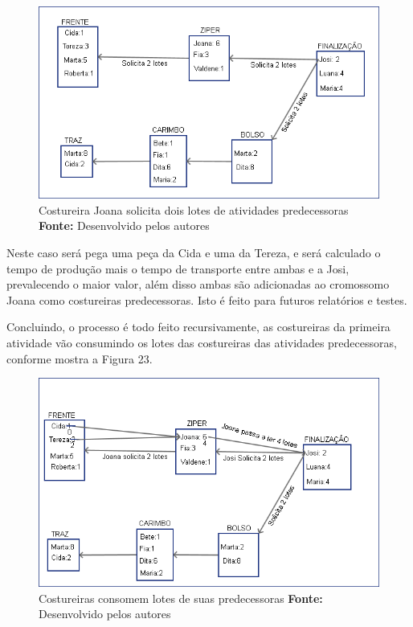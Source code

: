 \begin{figure}[h!]
	\centerline{\includegraphics[scale=0.7]{./imagens/processo_solciitacao_de_lotes2.png}}
	\caption[Distribuição de trabalho]
	{Costureira Joana solicita dois lotes de atividades predecessoras  \textbf{Fonte:} Desenvolvido pelos autores}
	\label{fig:exemplo1}
\end{figure}

\newpage

\par Neste caso será pega uma peça da Cida e uma da Tereza, e será calculado o tempo de produção mais o tempo de transporte entre ambas
e a Josi, prevalecendo o maior valor, além disso ambas são adicionadas ao cromossomo Joana como costureiras predecessoras. Isto é feito para futuros relatórios e testes.

\par Concluindo, o processo é todo feito recursivamente, as costureiras da primeira atividade vão consumindo os lotes das costureiras
das atividades predecessoras, conforme mostra a Figura 23.

\newpage

\begin{figure}[h!]
	\centerline{\includegraphics[scale=0.7]{./imagens/processo_solciitacao_de_lotes3.png}}
	\caption[Distribuição de trabalho]
	{Costureiras consomem lotes de suas predecessoras \textbf{Fonte:} Desenvolvido pelos autores}
	\label{fig:exemplo1}
\end{figure}


